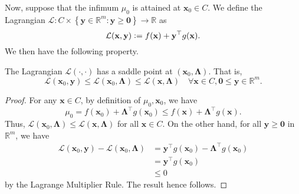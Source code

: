 Now, suppose that the infimum $\mu_0$ is attained at $\mathbf{x}_0 \in C$. We define the Lagrangian $\mathcal{L} \colon C \times \left\{ \mathbf{y} \in \mathbb{R}^m \colon \mathbf{y} \geq \mathbf{0} \right\} \to \mathbb{R}$ as
\[
    \mathcal{L}(\mathbf{x}, \mathbf{y}) \vcentcolon= f(\mathbf{x}) + \mathbf{y}^{\top} g(\mathbf{x}). 
\]
We then have the following property.

\begin{thm}
    The Lagrangian $\mathcal{L}(\cdot, \cdot)$ has a saddle point at $(\mathbf{x}_0, \bm{\Lambda})$. That is, 
    \[
        \mathcal{L}(\mathbf{x}_0, \mathbf{y}) \leq \mathcal{L}(\mathbf{x}_0, \bm{\Lambda}) \leq \mathcal{L}(\mathbf{x}, \bm{\Lambda}) \quad \forall \mathbf{x} \in C, \mathbf{0} \leq \mathbf{y} \in \mathbb{R}^m.
    \]
\end{thm}
\begin{proof}
    For any $\mathbf{x} \in C$, by definition of $\mu_0, \mathbf{x}_0$, we have
    \[
        \mu_0 = f(\mathbf{x}_0) + \bm{\Lambda}^{\top} g(\mathbf{x}_0) \leq f(\mathbf{x}) + \bm{\Lambda}^{\top} g(\mathbf{x}).
    \]
    Thus, $\mathcal{L}(\mathbf{x}_0, \bm{\Lambda}) \leq \mathcal{L}(\mathbf{x}, \bm{\Lambda})$ for all $\mathbf{x} \in C$. On the other hand, for all $\mathbf{y} \geq \mathbf{0}$ in $\mathbb{R}^m$, we have
    \begin{align*}
        \mathcal{L}(\mathbf{x}_0, \mathbf{y}) - \mathcal{L}(\mathbf{x}_0, \bm{\Lambda}) &= \mathbf{y}^{\top} g(\mathbf{x}_0) - \bm{\Lambda}^{\top} g(\mathbf{x}_0) \\
        &= \mathbf{y}^{\top} g(\mathbf{x}_0) \\
        &\leq 0
    \end{align*}
    by the Lagrange Multiplier Rule. The result hence follows. 
\end{proof}